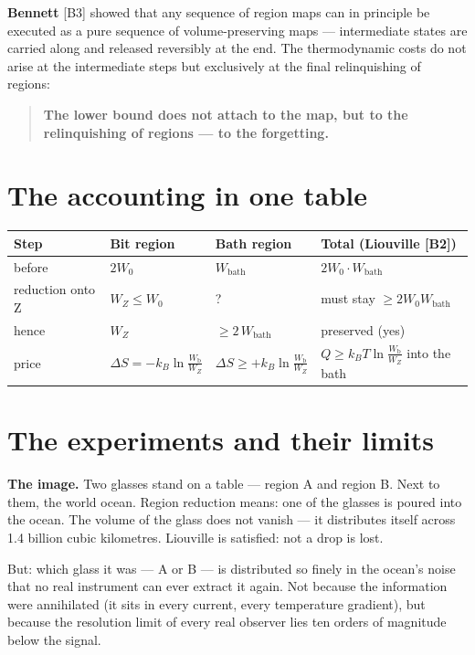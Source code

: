 \LB \textbf{Bennett} [B3] showed that any sequence of region maps can in principle
be executed as a pure sequence of volume-preserving maps --- intermediate states
are carried along and released reversibly at the end. The thermodynamic costs do
not arise at the intermediate steps but exclusively at the final relinquishing of
regions:

\begin{quote}
\LB \textbf{The lower bound does not attach to the map, but to the relinquishing
of regions --- to the forgetting.}
\end{quote}

\section{The accounting in one table}

\begin{center}
\small
\begin{tabular}{@{}llll@{}}
\toprule
\textbf{Step} & \textbf{Bit region} & \textbf{Bath region} & \textbf{Total (Liouville [B2])} \\
\midrule
before & $2W_0$ & $W_{\text{bath}}$ & $2W_0 \cdot W_{\text{bath}}$ \\
reduction onto Z & $W_Z \le W_0$ & ? & must stay $\ge 2W_0 W_{\text{bath}}$ \\
hence & $W_Z$ & $\ge 2\,W_{\text{bath}}$ & preserved (yes) \\
price & $\Delta S = -k_B \ln\frac{W_{\text{b}}}{W_Z}$ & $\Delta S \ge +k_B \ln\frac{W_{\text{b}}}{W_Z}$ & $Q \ge k_B T \ln\frac{W_{\text{b}}}{W_Z}$ into the bath \\
\bottomrule
\end{tabular}
\end{center}

\section{The experiments and their limits}
\label{sec:experiments}

\textbf{The image.} Two glasses stand on a table --- region A and region B. Next
to them, the world ocean. Region reduction means: one of the glasses is poured
into the ocean. The volume of the glass does not vanish --- it distributes itself
across 1.4 billion cubic kilometres. Liouville is satisfied: not a drop is lost.

But: which glass it was --- A or B --- is distributed so finely in the ocean's
noise that no real instrument can ever extract it again. Not because the
information were annihilated (it sits in every current, every temperature
gradient), but because the resolution limit of every real observer lies ten orders
of magnitude below the signal.

